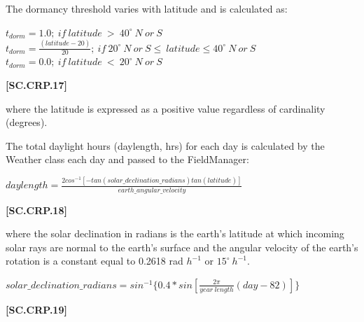 The dormancy threshold varies with latitude and is calculated as: 
    \vspace{0.2cm}

    \begin{center}
        \(t_{dorm} = 1.0;\ if\ latitude\ >\ 40^\circ\ N\ or\ S\)\\
        \(t_{dorm} = \frac{(latitude - 20)}{20};\ if\ 20^\circ\ N\ or\ S\leq\ latitude \leq 40^\circ\ N\ or\ S\)\\
        \(t_{dorm} = 0.0;\ if\ latitude\ <\ 20^\circ\ N\ or\ S\)\\    
    \end{center}
        \vspace{0.5cm}
    
            {\raggedleft \textbf{[SC.CRP.17]}\par}
            \vspace{0.5cm}

where the latitude is expressed as a positive value regardless of cardinality (degrees).

The total daylight hours (daylength, hrs) for each day is calculated by the Weather class each day and passed to the FieldManager: 
    \vspace{0.2cm}

    \begin{center}
        \(daylength=\frac{2cos^{-1}[-tan(solar\_declination\_radians)tan(latitude)]}{earth\_angular\_velocity}\)    
    \end{center}
        \vspace{0.5cm}
    
            {\raggedleft \textbf{[SC.CRP.18]}\par}
            \vspace{0.5cm}

where the solar declination in radians is the earth’s latitude at which incoming solar rays are normal to the earth’s surface and the angular velocity of the earth’s rotation is a constant equal to 0.2618 rad \(h^{-1}\) or \(15^\circ\ h^{-1}\).
    \vspace{0.2cm}

    \begin{center}
        \(solar\_declination\_radians=sin^{-1} \{0.4 * sin[\frac{2\pi
}{year\ length}(day-82)]\}\)    
    \end{center}
        \vspace{0.5cm}
    
            {\raggedleft \textbf{[SC.CRP.19]}\par}
            \vspace{0.5cm}



